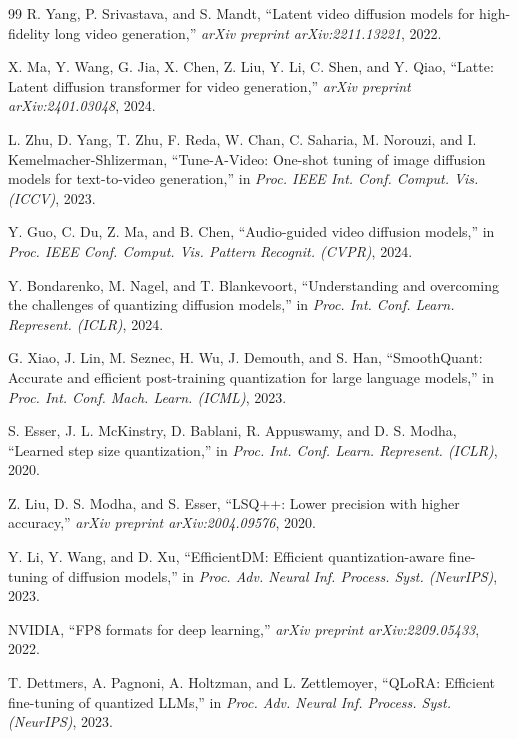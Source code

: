 \documentclass[journal,twoside]{IEEEtran}
\theoremstyle{definition}
\theoremstyle{remark}
\begin{document}
\begin{thebibliography}{99}
R. Yang, P. Srivastava, and S. Mandt, ``Latent video diffusion models for high-fidelity long video generation,'' \textit{arXiv preprint arXiv:2211.13221}, 2022.

X. Ma, Y. Wang, G. Jia, X. Chen, Z. Liu, Y. Li, C. Shen, and Y. Qiao, ``{Latte}: Latent diffusion transformer for video generation,'' \textit{arXiv preprint arXiv:2401.03048}, 2024.

L. Zhu, D. Yang, T. Zhu, F. Reda, W. Chan, C. Saharia, M. Norouzi, and I. Kemelmacher-Shlizerman, ``{Tune-A-Video}: One-shot tuning of image diffusion models for text-to-video generation,'' in \textit{Proc. IEEE Int. Conf. Comput. Vis. (ICCV)}, 2023.

Y. Guo, C. Du, Z. Ma, and B. Chen, ``Audio-guided video diffusion models,'' in \textit{Proc. IEEE Conf. Comput. Vis. Pattern Recognit. (CVPR)}, 2024.

Y. Bondarenko, M. Nagel, and T. Blankevoort, ``Understanding and overcoming the challenges of quantizing diffusion models,'' in \textit{Proc. Int. Conf. Learn. Represent. (ICLR)}, 2024.

G. Xiao, J. Lin, M. Seznec, H. Wu, J. Demouth, and S. Han, ``SmoothQuant: Accurate and efficient post-training quantization for large language models,'' in \textit{Proc. Int. Conf. Mach. Learn. (ICML)}, 2023.

S. Esser, J. L. McKinstry, D. Bablani, R. Appuswamy, and D. S. Modha, ``Learned step size quantization,'' in \textit{Proc. Int. Conf. Learn. Represent. (ICLR)}, 2020.

Z. Liu, D. S. Modha, and S. Esser, ``{LSQ++}: Lower precision with higher accuracy,'' \textit{arXiv preprint arXiv:2004.09576}, 2020.

Y. Li, Y. Wang, and D. Xu, ``EfficientDM: Efficient quantization-aware fine-tuning of diffusion models,'' in \textit{Proc. Adv. Neural Inf. Process. Syst. (NeurIPS)}, 2023.

NVIDIA, ``{FP8} formats for deep learning,'' \textit{arXiv preprint arXiv:2209.05433}, 2022.

T. Dettmers, A. Pagnoni, A. Holtzman, and L. Zettlemoyer, ``{QLoRA}: Efficient fine-tuning of quantized {LLM}s,'' in \textit{Proc. Adv. Neural Inf. Process. Syst. (NeurIPS)}, 2023.


\end{thebibliography}
\end{document}
